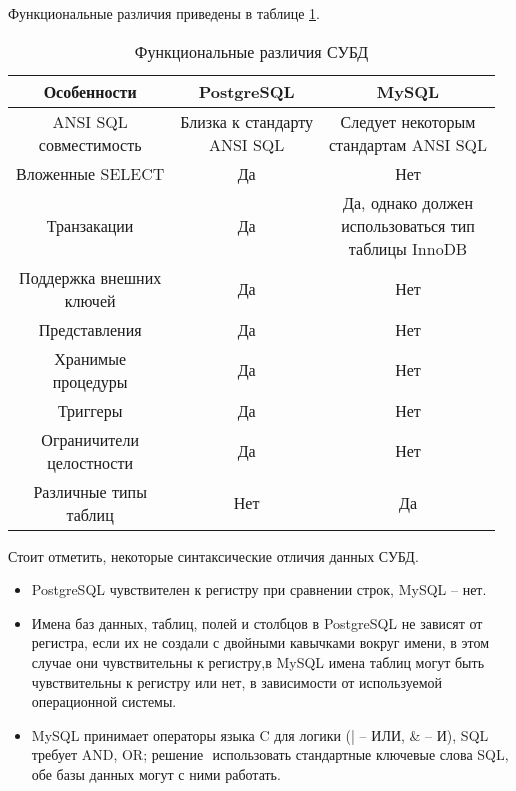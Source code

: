 Функциональные различия приведены в таблице \ref{diff_tbl}. 

\begin{table}[!h]
	\begin{center}
		\captionsetup{justification=raggedleft,singlelinecheck=off}
		\caption{\label{diff_tbl}Функциональные различия СУБД} 
		\begin{tabular}[c]{|c|c|c|}
			\hline
			\textbf{Особенности} & \textbf{PostgreSQL} & \textbf{MySQL} \\
			\hline
			\specialcell{ANSI SQL \\совместимость} & \specialcell{Близка к стандарту \\ANSI SQL} & \specialcell{Следует некоторым \\ стандартам ANSI SQL} \\
			\hline
			Вложенные SELECT & Да & Нет \\
			\hline
			Транзакации & Да & \specialcell{Да, однако должен \\ использоваться тип \\ таблицы InnoDB} \\
			\hline
			\specialcell{Поддержка внешних \\ ключей} & Да &Нет \\
			\hline
			Представления & Да &Нет \\
			\hline
			\specialcell{Хранимые \\ процедуры} & Да &Нет \\
			\hline
			Триггеры & Да &Нет \\
			\hline
			\specialcell{Ограничители \\ целостности} & Да &Нет \\
			\hline
			\specialcell{Различные типы \\таблиц} & Нет & Да \\
			\hline
		\end{tabular}
	\end{center}
\end{table}

Стоит отметить, некоторые синтаксические отличия данных СУБД.

\begin{itemize}
	\item PostgreSQL чувствителен к регистру при сравнении строк, MySQL --­ нет.
	\item Имена баз данных, таблиц, полей и столбцов в PostgreSQL не зависят от регистра, если их не создали	с двойными кавычками вокруг имени, в этом случае они чувствительны к регистру,в MySQL имена таблиц могут быть чувствительны	к регистру или нет, в зависимости от
	используемой операционной системы.
	\item MySQL принимает операторы языка C для логики (| -- ИЛИ, \& -- И), SQL требует AND, OR; решение ­ использовать стандартные ключевые слова SQL, обе базы данных могут с ними работать.
\end{itemize}

